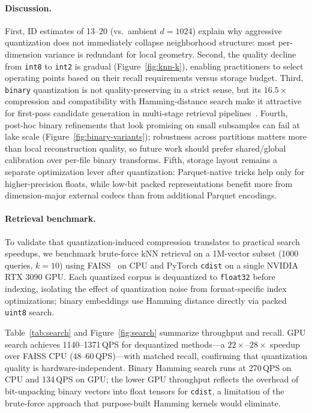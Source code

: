 \documentclass{article}
\begin{document}
\paragraph{Discussion.}

First, ID estimates of 13--20 (vs.\ ambient $d{=}1024$) explain why aggressive quantization does not immediately collapse neighborhood structure: most per-dimension variance is redundant for local geometry.
Second, the quality decline from \texttt{int8} to \texttt{int2} is gradual (Figure~\ref{fig:knn-k}), enabling practitioners to select operating points based on their recall requirements versus storage budget.
Third, \texttt{binary} quantization is not quality-preserving in a strict sense, but its $16.5\times$ compression and compatibility with Hamming-distance search make it attractive for first-pass candidate generation in multi-stage retrieval pipelines~\citep{wang2018binary}.
Fourth, post-hoc binary refinements that look promising on small subsamples can fail at lake scale (Figure~\ref{fig:binary-variants}); robustness across partitions matters more than local reconstruction quality, so future work should prefer shared/global calibration over per-file binary transforms.
Fifth, storage layout remains a separate optimization lever after quantization: Parquet-native tricks help only for higher-precision floats, while low-bit packed representations benefit more from dimension-major external codecs than from additional Parquet encodings.

\paragraph{Retrieval benchmark.}

To validate that quantization-induced compression translates to practical search speedups, we benchmark brute-force kNN retrieval on a 1M-vector subset (\num{1000} queries, $k{=}10$) using FAISS~\citep{johnson2021faiss} on CPU and PyTorch \texttt{cdist} on a single NVIDIA RTX 3090 GPU.
Each quantized corpus is dequantized to \texttt{float32} before indexing, isolating the effect of quantization noise from format-specific index optimizations; binary embeddings use Hamming distance directly via packed \texttt{uint8} search.

Table~\ref{tab:search} and Figure~\ref{fig:search} summarize throughput and recall.
GPU search achieves \num{1140}--\num{1371}\,QPS for dequantized methods---a $22\times$--$28\times$ speedup over FAISS CPU (\num{48}--\num{60}\,QPS)---with matched recall, confirming that quantization quality is hardware-independent.
Binary Hamming search runs at \num{270}\,QPS on CPU and \num{134}\,QPS on GPU; the lower GPU throughput reflects the overhead of bit-unpacking binary vectors into float tensors for \texttt{cdist}, a limitation of the brute-force approach that purpose-built Hamming kernels would eliminate.
\end{document}
